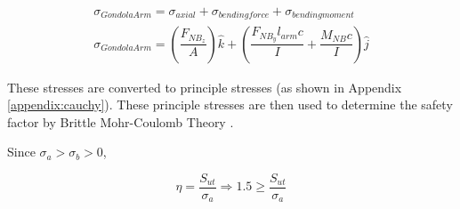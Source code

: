 \documentclass[../main.tex]{subfiles}
\begin{document}
\begin{align}
	\sigma _{Gondola Arm} = \sigma _{axial} + \sigma _{bending force} + \sigma _{bending moment} \\ \label{armStress}
	\sigma _{Gondola Arm}  = \left(\dfrac{F_{NB_{z}}}{A}\right)\hat{k} + \left(\dfrac{F_{NB_{y}}l_{arm}c}{I}  + \dfrac{M_{NB}c}{I} \right) \hat{j}
\end{align}

These stresses are converted to principle stresses (as shown in Appendix \ref{appendix:cauchy}). These principle stresses are then used to determine the safety factor by Brittle Mohr-Coulomb Theory \cite[227]{shigley}.

Since $\sigma _a > \sigma _b > 0$,

\begin{equation}
	\eta = \dfrac{S_{ut}}{\sigma _a} \Rightarrow 1.5 \geq \dfrac{S_{ut}}{\sigma _a}
\end{equation}
\end{document}
